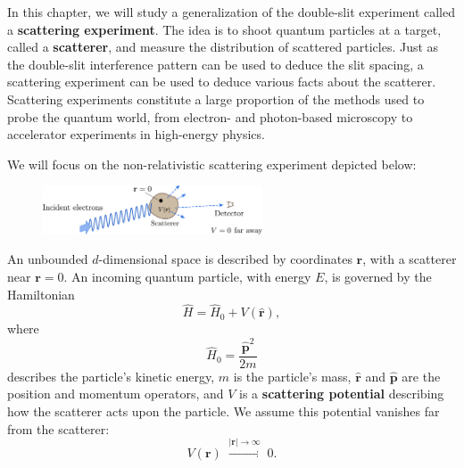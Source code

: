 \documentclass[prx,12pt]{revtex4-2}
\begin{document}
In this chapter, we will study a generalization of the double-slit
experiment called a \textbf{scattering experiment}.  The idea is to
shoot quantum particles at a target, called a \textbf{scatterer}, and
measure the distribution of scattered particles.  Just as the
double-slit interference pattern can be used to deduce the slit
spacing, a scattering experiment can be used to deduce various facts
about the scatterer.  Scattering experiments constitute a large
proportion of the methods used to probe the quantum world, from
electron- and photon-based microscopy to accelerator experiments in
high-energy physics.

We will focus on the non-relativistic scattering experiment depicted
below:

\begin{figure}[h]
  \centering\includegraphics[width=0.58\textwidth]{scattering}
\end{figure}

\noindent
An unbounded $d$-dimensional space is described
by coordinates $\mathbf{r}$, with a scatterer near $\mathbf{r} = 0$.
An incoming quantum particle, with energy $E$, is governed by the
Hamiltonian
\begin{equation}
  \hat{H} = \hat{H}_0 + V(\hat{\mathbf{r}}),
\end{equation}
where
\begin{equation}
  \hat{H}_0 = \frac{\hat{\mathbf{p}}^2}{2m}
\end{equation}
describes the particle's kinetic energy, $m$ is the particle's mass,
$\hat{\mathbf{r}}$ and $\hat{\mathbf{p}}$ are the position and
momentum operators, and $V$ is a \textbf{scattering potential}
describing how the scatterer acts upon the particle.  We assume this
potential vanishes far from the scatterer:
\begin{equation}
  V(\mathbf{r}) \; \overset{|\mathbf{r}| \rightarrow \infty}{\longrightarrow}\; 0.
\end{equation}
\end{document}
